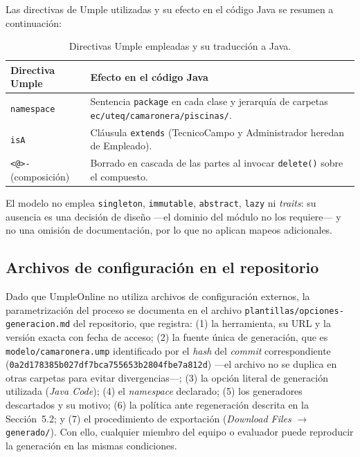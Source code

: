 Las directivas de Umple utilizadas y su efecto en el código Java se
resumen a continuación:

\begin{table}[h]
  \centering
  \caption{Directivas Umple empleadas y su traducción a Java.}
  \begin{tabular}{|l|p{8.5cm}|}
    \hline
    \textbf{Directiva Umple} & \textbf{Efecto en el código Java} \\
    \hline
    \texttt{namespace} &
      Sentencia \texttt{package} en cada clase y jerarquía de
      carpetas \texttt{ec/uteq/camaronera/piscinas/}. \\
    \hline
    \texttt{isA} &
      Cláusula \texttt{extends} (TecnicoCampo y Administrador heredan
      de Empleado). \\
    \hline
    \texttt{<@>-} (composición) &
      Borrado en cascada de las partes al invocar \texttt{delete()}
      sobre el compuesto. \\
    \hline
  \end{tabular}
\end{table}

El modelo no emplea \texttt{singleton}, \texttt{immutable},
\texttt{abstract}, \texttt{lazy} ni \emph{traits}: su ausencia es una
decisión de diseño ---el dominio del módulo no los requiere--- y no
una omisión de documentación, por lo que no aplican mapeos
adicionales.

\subsection{Archivos de configuración en el repositorio}

Dado que UmpleOnline no utiliza archivos de configuración externos,
la parametrización del proceso se documenta en el archivo
\texttt{plantillas/opciones-generacion.md} del repositorio, que
registra: (1) la herramienta, su URL y la versión exacta con fecha de
acceso; (2) la fuente única de generación, que es
\texttt{modelo/camaronera.ump} identificado por el \emph{hash} del
\emph{commit} correspondiente
(\texttt{0a2d178385b027df7bca755653b2804fbe7a812d}) ---el archivo no se duplica en otras
carpetas para evitar divergencias---; (3) la opción literal de
generación utilizada (\emph{Java Code}); (4) el \emph{namespace}
declarado; (5) los generadores descartados y su motivo; (6) la
política ante regeneración descrita en la Sección~5.2; y (7) el
procedimiento de exportación (\emph{Download Files}
$\rightarrow$ \texttt{generado/}). Con ello, cualquier miembro del
equipo o evaluador puede reproducir la generación en las mismas
condiciones.

